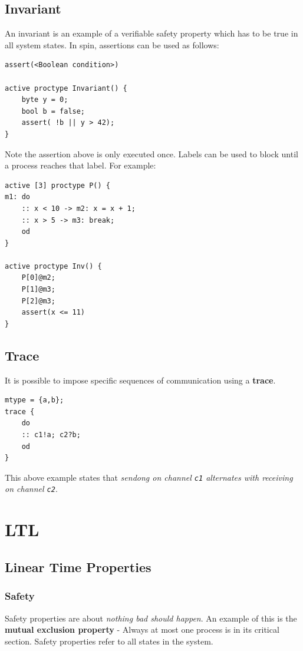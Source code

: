 \documentclass[11pt]{article}
\theoremstyle{definition}
\begin{document}
\subsection{Invariant}
An invariant is an example of a verifiable safety property which has to be true in all system states. In spin, assertions can be used as follows:
\begin{lstlisting}[caption={PROMELA assertion}]
assert(<Boolean condition>)

active proctype Invariant() {
	byte y = 0;
	bool b = false;
	assert( !b || y > 42);
}
\end{lstlisting}
Note the assertion above is only executed once. Labels can be used to block until a process reaches that label. For example:
\begin{lstlisting}[caption={PROMELA labels}]
active [3] proctype P() {
m1: do
	:: x < 10 -> m2: x = x + 1;
	:: x > 5 -> m3: break;
	od
}

active proctype Inv() {
	P[0]@m2;
	P[1]@m3;
	P[2]@m3;
	assert(x <= 11)
}
\end{lstlisting}

\subsection{Trace}
It is possible to impose specific sequences of communication using a \textbf{trace}.
\begin{lstlisting}[caption={Example of a trace}]
mtype = {a,b};
trace {
	do
	:: c1!a; c2?b;
	od
}
\end{lstlisting}
This above example states that \textit{sendong on channel \texttt{c1} alternates with receiving on channel \texttt{c2}}.
\section{LTL}

\subsection{Linear Time Properties}

\subsubsection{Safety}
Safety properties are about \textit{nothing bad should happen}. An example of this is the \textbf{mutual exclusion property} - Always at most one process is in its critical section.
\n
Safety properties refer to all states in the system.
\end{document}
